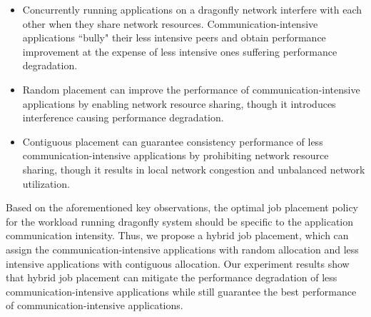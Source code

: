 


\begin{itemize}
   
    \item Concurrently running applications on a dragonfly network interfere with each other when they share network resources. Communication-intensive applications ``bully" their less intensive peers and obtain performance improvement at the expense of less intensive ones suffering performance degradation. 
    
    \item Random placement can improve the performance of communication-intensive applications by enabling network resource sharing, though it introduces interference causing performance degradation.
    
    \item Contiguous placement can guarantee consistency performance of less communication-intensive applications by prohibiting network resource sharing, though it results in local network congestion and unbalanced network utilization.
    
\end{itemize}

Based on the aforementioned key observations, the optimal job placement policy for the workload running dragonfly system should be specific to the application communication intensity. Thus, we propose a hybrid job placement, which can assign the communication-intensive applications with random allocation and less intensive applications with contiguous allocation. Our experiment results show that hybrid job placement can mitigate the performance degradation of less communication-intensive applications while still guarantee the best performance of communication-intensive applications.

